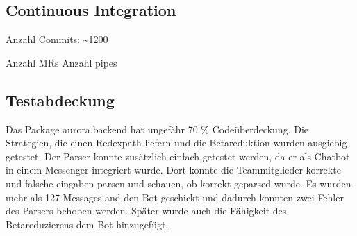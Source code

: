 \documentclass[parskip=full,11pt,twoside]{scrartcl}
\begin{document}
\subsection{Continuous Integration}
Anzahl Commits: \textasciitilde  1200\newline

Anzahl MRs\newline
Anzahl pipes\newline


\subsection{Testabdeckung}
Das Package aurora.backend hat ungefähr 70 \% Codeüberdeckung.
Die Strategien, die einen Redexpath liefern und die Betareduktion wurden ausgiebig getestet.
Der Parser konnte zusätzlich einfach getestet werden, da er als Chatbot in einem Messenger integriert wurde.
Dort konnte die Teammitglieder korrekte und falsche eingaben parsen und schauen,
ob korrekt geparsed wurde.
Es wurden mehr als 127 Messages and den Bot geschickt und dadurch konnten zwei
Fehler des Parsers behoben werden.
Später wurde auch die Fähigkeit des Betareduzierens dem Bot hinzugefügt.
\newpage
\end{document}
